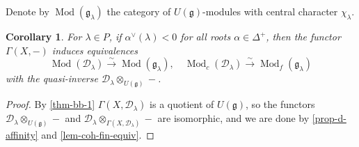 \documentclass[11pt, a4paper]{article}
\newtheorem{corollary}[theorem]{Corollary}
\theoremstyle{definition}
\newcommand{\D}[0]{\Delta}
\newcommand{\Mod}{\operatorname{Mod}}
\newcommand{\g}{\mathfrak g}
\begin{document}
    Denote by $\Mod(\g_\lambda)$ the category of $U(\g)$-modules with central character $\chi_\lambda$. 
    \begin{corollary}
        For $\lambda\in P$, if $\alpha^\vee(\lambda)< 0$ for all roots $\alpha\in\D^+$, then the functor $\Gamma(X, -)$ induces equivalences
        \[\Mod(\mathcal D_\lambda)\xrightarrow{\sim}\Mod(\g_\lambda),\quad\Mod_c(\mathcal D_\lambda)\xrightarrow{\sim}\Mod_f(\g_\lambda)\]
        with the quasi-inverse $\mathcal D_\lambda\otimes_{U(\g)}-$.
    \end{corollary}
    \begin{proof}
        By \cref{thm-bb-1} $\Gamma(X, \mathcal D_\lambda)$ is a quotient of $U(\g)$, so the functors $\mathcal D_\lambda\otimes_{U(\g)}-$ and $\mathcal D_\lambda\otimes_{\Gamma(X, \mathcal D_\lambda)}-$ are isomorphic, and we are done by \cref{prop-d-affinity} and \cref{lem-coh-fin-equiv}.
    \end{proof}
\end{document}
